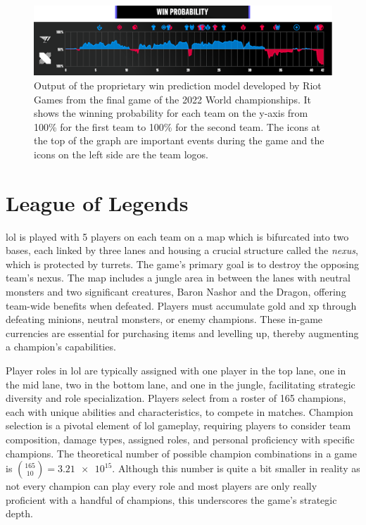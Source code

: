 \documentclass[12pt, a4paper, headinclude, twoside, plainheadsepline, open=right, numbers=noenddot, hidelinks, toc=listof, toc=bibliography]{scrreprt}
\begin{document}
\begin{figure}
\centering
\includegraphics[width=\textwidth]{./images/win_prob_worlds.png}
\caption{Output of the proprietary win prediction model developed by Riot Games from the final game of the 2022 World championships. It shows the winning probability for each team on the y-axis from 100\% for the first team to 100\% for the second team. The icons at the top of the graph are important events during the game and the icons on the left side are the team logos.\cite{LoLEsports}}
\label{fig:riot_win_pred_graph}
\end{figure}


\section*{League of Legends}
\label{sec:LoL}

\Ac{lol} is played with 5 players on each team on a map which is bifurcated into two bases, each linked by three lanes and housing a crucial structure called the \textit{nexus}, which is protected by turrets. 
The game's primary goal is to destroy the opposing team's nexus.
The map includes a jungle area in between the lanes with neutral monsters and two significant creatures, Baron Nashor and the Dragon, offering team-wide benefits when defeated.
Players must accumulate gold and \ac{xp} through defeating minions, neutral monsters, or enemy champions. 
These in-game currencies are essential for purchasing items and levelling up, thereby augmenting a champion's capabilities.

Player roles in \ac{lol} are typically assigned with one player in the top lane, one in the mid lane, two in the bottom lane, and one in the jungle, facilitating strategic diversity and role specialization.
Players select from a roster of 165 champions, each with unique abilities and characteristics, to compete in matches.
Champion selection is a pivotal element of \ac{lol} gameplay, requiring players to consider team composition, damage types, assigned roles, and personal proficiency with specific champions. 
The theoretical number of possible champion combinations in a game is $\binom{165}{10} = \num{3.21e15}$.
Although this number is quite a bit smaller in reality as not every champion can play every role and most players are only really proficient with a handful of champions, this underscores the game's strategic depth.
\end{document}
